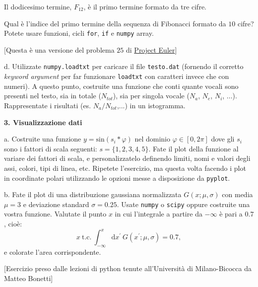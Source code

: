 \documentclass[addpoints]{exam}
\newenvironment{palatino}{\fontfamily{ppl}\selectfont}{\par}
\begin{document}
\begin{palatino}
Il dodicesimo termine, $F_{12}$, è il primo termine formato da tre cifre.

Qual è l'indice del primo termine della sequenza di Fibonacci formato da $10$ cifre? 
Potete usare funzioni, cicli \texttt{for}, \texttt{if} e \texttt{numpy} array.

\hphantom{ciao}

[Questa è una versione del problema $25$ di \href{https://projecteuler.net/problem=25}{Project Euler}]

\hphantom{ciao}
 
d. \quad Utilizzate \texttt{numpy.loadtxt} per caricare il file \texttt{testo.dat} (fornendo il corretto \textit{keyword argument} per far funzionare \texttt{loadtxt} con caratteri invece che con numeri). A questo punto, costruite una funzione che conti quante vocali sono presenti nel testo, sia in totale ($N_{tot}$), sia per singola vocale ($N_a$, $N_e$, $N_i$, ...). Rappresentate i risultati (es. $N_a/N_{tot}$,...) in un istogramma.

\hphantom{ciao}
	
\textbf{3. Visualizzazione dati} \\

\hphantom{ciao}

a. Costruite una funzione $y=\mathrm{sin}(s_i*\varphi)$ nel dominio $\varphi \in [0,2\pi]$ dove gli $s_i$ sono i fattori di scala seguenti: $s=\{1,2,3,4,5\}$. Fate il plot della funzione al variare dei fattori di scala, e personalizzatelo definendo limiti, nomi e valori degli assi, colori, tipi di linea, etc.
Ripetete l'esercizio, ma questa volta facendo i plot in coordinate polari utilizzando le opzioni messe a disposizione da \texttt{pyplot}. 

\hphantom{ciao}

b. \quad Fate il plot di una distribuzione gaussiana normalizzata $G(x;\mu,\sigma)$ con media $\mu=3$ e deviazione standard $\sigma=0.25$. Usate \texttt{numpy} o \texttt{scipy} oppure costruite una vostra funzione.
Valutate il punto $x$ in cui l'integrale a partire da $-\infty$ è pari a $0.7$, cioè:
\begin{equation*}
	x \ \mathrm{t.c.} \ \int_{-\infty}^x \mathrm{d}x^\prime \ G(x^\prime; \mu,\sigma)=0.7,
\end{equation*}
e colorate l'area corrispondente.

\hphantom{ciao}

[Esercizio preso dalle lezioni di python tenute all'Università di Milano-Bicocca da Matteo Bonetti]


\end{palatino}
\end{document}
